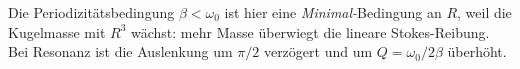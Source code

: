 \begin{merksatz}
Die Periodizitätsbedingung $\beta<\omega_0$ ist hier eine \emph{Minimal-}Bedingung
an $R$, weil die Kugelmasse mit $R^3$ wächst: mehr Masse überwiegt die
lineare Stokes-Reibung. Bei Resonanz ist die Auslenkung um $\pi/2$ verzögert
und um $Q=\omega_0/2\beta$ überhöht.
\end{merksatz}
